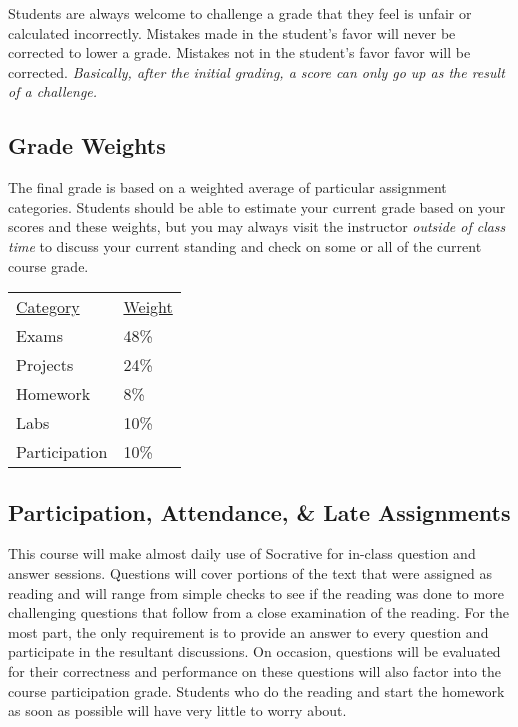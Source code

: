 \documentclass[10pt]{article}
\begin{document}
Students are always welcome to challenge a grade that they feel is unfair or calculated incorrectly.  Mistakes made in the student's favor will never be corrected to lower a grade.  Mistakes not in the student's favor favor will be corrected.  \textit{Basically, after the initial grading, a score can only go up as the result of a challenge.}



\subsection{Grade Weights}

The final grade is based on a weighted average of particular assignment categories.  Students should be able to estimate your current grade based on your scores and these weights, but you may always visit the instructor \textit{outside of class time} to discuss your current standing and check on some or all of the current course grade.

\begin{center}
  \begin{tabular}{ll}
  \underline{Category} & \underline{Weight} \\
    Exams & 48\% \\ %
    Projects & 24\% \\ %
    Homework & 8\% \\ %
    Labs & 10\% \\ %
    Participation & 10\%
  \end{tabular}
\end{center}

\subsection{Participation, Attendance, \& Late Assignments}

This course will make almost daily use of Socrative for in-class question and answer sessions. Questions will cover portions of the text that were assigned as reading and will range from simple checks to see if the reading was done to more challenging questions that follow from a close examination of the reading.  For the most part, the only requirement is to provide an answer to every question and participate in the resultant discussions.  On occasion, questions will be evaluated for their correctness and performance on these questions will also factor into the course participation grade.  Students who do the reading and start the homework as soon as possible will have very little to worry about.
\end{document}
